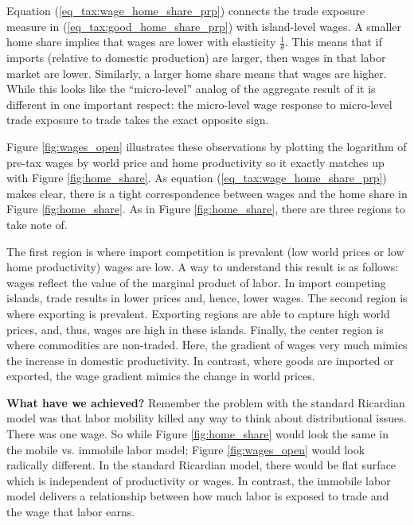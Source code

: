 \documentclass[pdftex,12pt]{article}
\begin{document}
\medskip
\noindent Equation (\ref{eq_tax:wage_home_share_prp}) connects the trade exposure measure in (\ref{eq_tax:good_home_share_prp}) with island-level wages. A smaller home share implies that wages are lower with elasticity $\frac{1}{\theta}$. This means that if imports (relative to domestic production) are larger, then wages in that labor market are lower. Similarly, a larger home share means that wages are higher. While this looks like the ``micro-level'' analog of the aggregate result of \citet{arkolakis2012new} it is different in one important respect: the micro-level wage response to micro-level trade exposure to trade takes the exact opposite sign.

\medskip
\noindent Figure \ref{fig:wages_open} illustrates these observations by plotting the logarithm of pre-tax wages by world price and home productivity so it exactly matches up with Figure \ref{fig:home_share}. As equation (\ref{eq_tax:wage_home_share_prp}) makes clear, there is a tight correspondence between wages and the home share in Figure \ref{fig:home_share}. As in Figure \ref{fig:home_share}, there are three regions to take note of.

\medskip
\noindent The first region is where import competition is prevalent (low world prices or low home productivity) wages are low. A way to understand this result is as follows: wages reflect the value of the marginal product of labor. In import competing islands, trade results in lower prices and, hence, lower wages. The second region is where exporting is prevalent. Exporting regions are able to capture high world prices, and, thus, wages are high in these islands. Finally, the center region is where commodities are non-traded. Here, the gradient of wages very much mimics the increase in domestic productivity. In contrast, where goods are imported or exported, the wage gradient mimics the change in world prices.

\medskip
\noindent \textbf{What have we achieved?} Remember the problem with the standard Ricardian model was that labor mobility killed any way to think about distributional issues. There was one wage. So while Figure \ref{fig:home_share} would look the same in the mobile vs. immobile labor model; Figure \ref{fig:wages_open} would look radically different. In the standard Ricardian model, there would be flat surface which is independent of productivity or wages. In contrast, the immobile labor model delivers a relationship between how much labor is exposed to trade and the wage that labor earns.
\end{document}
